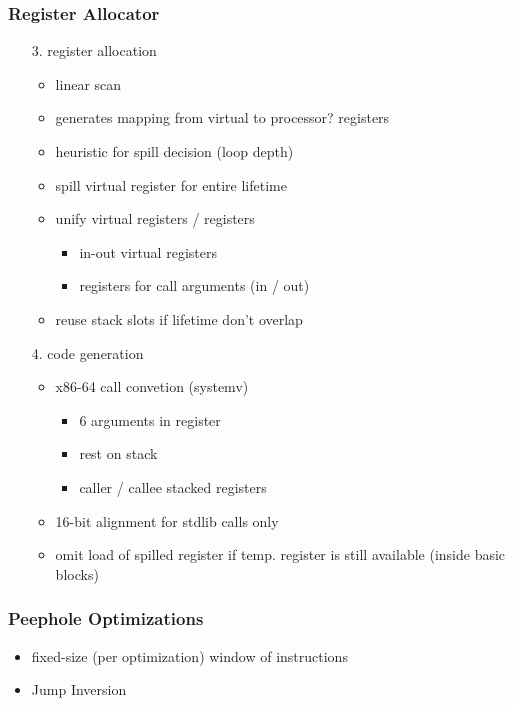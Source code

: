 \documentclass[navbaroff,en]{sdqbeamer}
\begin{document}
\begin{frame}
    \frametitle{Register Allocator}

    \begin{itemize}
        \item[3.] register allocation
        \begin{itemize}
            \item linear scan
            \item generates mapping from virtual to processor? registers
            \item heuristic for spill decision (loop depth)
            \item spill virtual register for entire lifetime
            \item unify virtual registers / registers
            \begin{itemize}
                \item in-out virtual registers
                \item registers for call arguments (in / out)
            \end{itemize}
            \item reuse stack slots if lifetime don't overlap
        \end{itemize}
        \item[4.] code generation
        \begin{itemize}
            \item x86-64 call convetion (systemv)
            \begin{itemize}
                \item 6 arguments in register
                \item rest on stack
                \item caller / callee stacked registers
            \end{itemize}
            \item 16-bit alignment for stdlib calls only
            \item omit load of spilled register if temp. register is still available (inside basic blocks)
        \end{itemize}
    \end{itemize}

\end{frame}

\begin{frame}
    \frametitle{Peephole Optimizations}

    \begin{itemize}
        \item fixed-size (per optimization) window of instructions
        \vspace{1em}
        \item Jump Inversion
    \end{itemize}

\end{frame}
\end{document}
